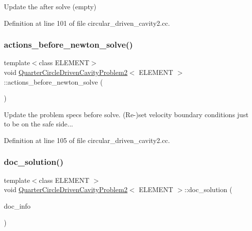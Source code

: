 Update the after solve (empty) 



Definition at line 101 of file circular\+\_\+driven\+\_\+cavity2.\+cc.

\mbox{\label{classQuarterCircleDrivenCavityProblem2_aed64247640938ca570da33238e9696ac}} 
\subsubsection{\texorpdfstring{actions\+\_\+before\+\_\+newton\+\_\+solve()}{actions\_before\_newton\_solve()}}
{\footnotesize\ttfamily template$<$class E\+L\+E\+M\+E\+NT$>$ \\
void \hyperlink{classQuarterCircleDrivenCavityProblem2}{Quarter\+Circle\+Driven\+Cavity\+Problem2}$<$ E\+L\+E\+M\+E\+NT $>$\+::actions\+\_\+before\+\_\+newton\+\_\+solve (\begin{DoxyParamCaption}{ }\end{DoxyParamCaption})\hspace{0.3cm}{\ttfamily [inline]}}



Update the problem specs before solve. (Re-\/)set velocity boundary conditions just to be on the safe side... 



Definition at line 105 of file circular\+\_\+driven\+\_\+cavity2.\+cc.

\mbox{\label{classQuarterCircleDrivenCavityProblem2_a506c1a77cc9a11f586f5cc1b4a252798}} 
\subsubsection{\texorpdfstring{doc\+\_\+solution()}{doc\_solution()}}
{\footnotesize\ttfamily template$<$class E\+L\+E\+M\+E\+NT $>$ \\
void \hyperlink{classQuarterCircleDrivenCavityProblem2}{Quarter\+Circle\+Driven\+Cavity\+Problem2}$<$ E\+L\+E\+M\+E\+NT $>$\+::doc\+\_\+solution (\begin{DoxyParamCaption}\item[{Doc\+Info \&}]{doc\+\_\+info }\end{DoxyParamCaption})}



